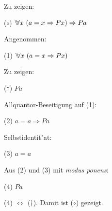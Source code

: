 \documentclass[a4paper]{article}
\newcommand{\Ex}{\Exists}
\begin{document}
Zu zeigen:

\vspace{2pt}
($\circ$) \hspace*{1em} $\Forall x \ (a=x \Then Px) \Then Pa$

\vspace{2pt}
Angenommen:

\vspace{2pt}
(1) \hspace*{1em} $\Forall x \ (a=x \Then Px)$

\vspace{2pt}
Zu zeigen:  

\vspace{2pt}
($\dagger$) \hspace*{1em}  $Pa$

\vspace{2pt}
Allquantor-Beseitigung auf (1):

\vspace{2pt}
(2) \hspace*{1em} $a = a \Rightarrow Pa$

\vspace{2pt}
Selbstidentit"at: 

\vspace{2pt}
(3) \hspace*{1em}  $a = a$
\vspace{2pt}

Aus (2) und (3) mit \emph{modus ponens}: 

\vspace{2pt}
(4) \hspace*{1em}  $Pa$


\vspace{10pt}
(4) $\Leftrightarrow$ ($\dagger$). Damit ist ($\circ$) gezeigt.




%
%
%
%
%
%
%
%
%
%
%
%
\end{document}
